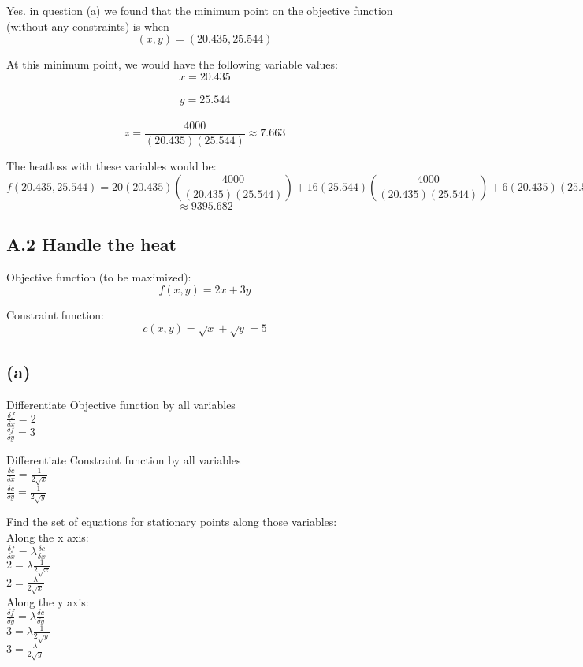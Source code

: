 \documentclass[11pt]{article}
\begin{document}
Yes. in question (a) we found that the minimum point on the objective
function (without any constraints) is when \[(x,y) = (20.435,25.544)\]

At this minimum point, we would have the following variable values:\\
\[x = 20.435\]\\
\[y = 25.544\]\\
\[z = \frac {4000}{(20.435)(25.544)} \approx 7.663\]

The heatloss with these variables would be:\\
\[f(20.435,25.544) = 20(20.435)(\frac {4000}{(20.435)(25.544)}) + 16(25.544)(\frac {4000}{(20.435)(25.544)}) + 6(20.435)(25.544)\]
\[\approx 9395.682\]

    \subsection{A.2 Handle the heat}\label{a.2-handle-the-heat}

Objective function (to be maximized):\\
\[f(x,y) = 2x+3y\]

Constraint function:\\
\[c(x,y) = \sqrt{x} + \sqrt{y} = 5\]

    \subsection{(a)}\label{a}

Differentiate Objective function by all variables\\
\(\frac{\delta f}{\delta x} = 2\)\\
\(\frac{\delta f}{\delta y} = 3\)

Differentiate Constraint function by all variables\\
\(\frac{\delta c}{\delta x} = \frac{1}{2\sqrt{x}}\)\\
\(\frac{\delta c}{\delta y} = \frac{1}{2\sqrt{y}}\)

Find the set of equations for stationary points along those variables:\\
Along the x axis:\\
\(\frac{\delta f}{\delta x} = \lambda \frac{\delta c}{\delta x}\)\\
\(2 = \lambda \frac{1}{2\sqrt{x}}\)\\
\(2 = \frac{\lambda}{2\sqrt{x}}\)\\
Along the y axis:\\
\(\frac{\delta f}{\delta y} = \lambda \frac{\delta c}{\delta y}\)\\
\(3 = \lambda \frac{1}{2\sqrt{y}}\)\\
\(3 = \frac{\lambda}{2\sqrt{y}}\)
\end{document}
